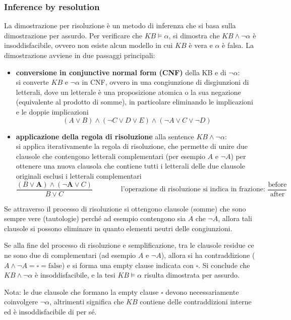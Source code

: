\subsubsection*{Inference by resolution}
La dimostrazione per risoluzione è un metodo di inferenza che si basa sulla dimostrazione per assurdo. Per verificare che
\(KB \models \alpha\), si dimostra che \(KB \land \neg \alpha\) è insoddisfacibile, ovvero non esiste alcun modello in cui
\(KB\) è vera e \(\alpha\) è falsa. La dimostrazione avviene in due passaggi principali:
\begin{itemize}
	\item \textbf{conversione in conjunctive normal form (CNF)} della KB e di \(\neg \alpha\): \\
	si converte \(KB\) e \(\neg \alpha\) in CNF, ovvero in una congiunzione di disgiunzioni di letterali, dove un letterale è
	una proposizione atomica o la sua negazione (equivalente al prodotto di somme), in particolare eliminando le implicazioni
	e le doppie implicazioni
	\[(A \lor B) \land (\neg C \lor D \lor E) \land (\neg A \lor C \lor \neg D)\]
	\item \textbf{applicazione della regola di risoluzione} alla sentence \(KB \land \neg \alpha\): \\
	si applica iterativamente la regola di risoluzione, che permette di unire due clausole che contengono letterali complementari
	(per esempio \(A\) e \(\neg A\)) per ottenere una nuova clausola che contiene tutti i letterali delle due clausole originali
	esclusi i letterali complementari
	\[\frac{(B \lor \textbf{A}) \land (\neg \textbf{A} \lor C)}{B \lor C} \qquad \qquad \text{l'operazione di risoluzione si indica in frazione: } \frac{\text{before}}{\text{after}}\]
\end{itemize}
Se attraverso il processo di risoluzione si ottengono clausole (somme) che sono sempre vere (tautologie) perché ad esempio
contengono sia \(A\) che \(\neg A\), allora tali clausole si possono eliminare in quanto elementi neutri delle congiunzioni.

Se alla fine del processo di risoluzione e semplificazione, tra le clausole residue ce ne sono due di complementari (ad esempio
\(A\) e \(\neg A\)), allora si ha contraddizione (\(A \land \neg A = \square = \text{false}\)) e si forma una empty clause
indicata con \(\square\). Si conclude che \(KB \land \neg \alpha\) è insoddisfacibile, e la tesi \(KB \models \alpha\)
risulta dimostrata per assurdo.

Nota: le due clausole che formano la empty clause \(\square\) devono necessariamente coinvolgere \(\neg \alpha\),
altrimenti significa che \(KB\) contiene delle contraddizioni interne ed è insoddisfacibile di per sé.

